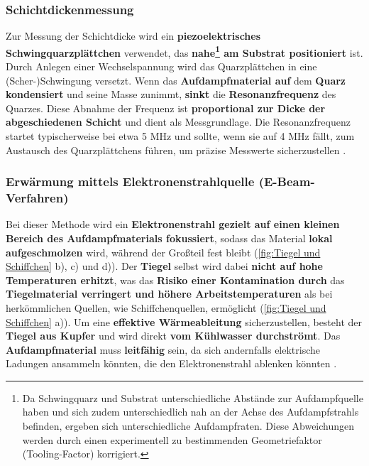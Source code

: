 \documentclass{article} %
\begin{document}
\vspace{1em}
\subsubsection{Schichtdickenmessung}
Zur Messung der Schichtdicke wird ein \textbf{piezoelektrisches Schwingquarzplättchen} verwendet, das \textbf{nahe\footnote{Da Schwingquarz und Substrat 
unterschiedliche Abstände zur Aufdampfquelle haben und sich zudem unterschiedlich nah an der Achse des Aufdampfstrahls befinden, ergeben sich unterschiedliche Aufdampfraten. Diese Abweichungen 
werden durch einen experimentell zu bestimmenden Geometriefaktor (Tooling-Factor) korrigiert.} am Substrat positioniert} ist. Durch Anlegen einer Wechselspannung wird 
das Quarzplättchen in eine (Scher-)Schwingung versetzt. Wenn das \textbf{Aufdampfmaterial auf} dem \textbf{Quarz kondensiert} und seine Masse zunimmt, \textbf{sinkt} die \textbf{Resonanzfrequenz} des 
Quarzes. Diese Abnahme der Frequenz ist \textbf{proportional zur Dicke der abgeschiedenen Schicht} und dient als Messgrundlage. Die Resonanzfrequenz startet typischerweise bei 
etwa 5 MHz und sollte, wenn sie auf 4 MHz fällt, zum Austausch des Quarzplättchens führen, um präzise Messwerte sicherzustellen \cite{keplinger2024}.

\vspace{1em}
\subsubsection{Erwärmung mittels Elektronenstrahlquelle (E-Beam-Verfahren)}

Bei dieser Methode wird ein \textbf{Elektronenstrahl gezielt auf einen kleinen Bereich des Aufdampfmaterials fokussiert}, sodass das Material 
\textbf{lokal aufgeschmolzen} wird, während der Großteil fest bleibt (\autoref{fig:Tiegel und Schiffchen} b), c) und d)). Der \textbf{Tiegel} selbst wird dabei 
\textbf{nicht auf hohe Temperaturen erhitzt}, was das \textbf{Risiko einer Kontamination durch} das \textbf{Tiegelmaterial verringert und höhere Arbeitstemperaturen} als bei 
herkömmlichen Quellen, wie Schiffchenquellen, ermöglicht (\autoref{fig:Tiegel und Schiffchen} a)). Um eine \textbf{effektive Wärmeableitung} sicherzustellen, 
besteht der \textbf{Tiegel aus Kupfer} und wird direkt \textbf{vom Kühlwasser durchströmt}. Das \textbf{Aufdampfmaterial} muss \textbf{leitfähig} sein, da sich 
andernfalls elektrische Ladungen ansammeln könnten, die den Elektronenstrahl ablenken könnten \cite{keplinger2024}.
\end{document}
